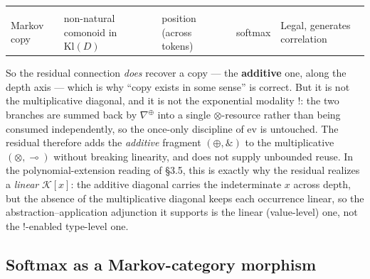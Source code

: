 \documentclass[a4paper,11pt]{article}
\begin{document}
\begin{longtable}[]{@{}lllll@{}}
\begin{minipage}[t]{0.17\columnwidth}
\end{minipage}\tabularnewline
\begin{minipage}[t]{0.17\columnwidth}\raggedright
Markov copy\strut
\end{minipage} & \begin{minipage}[t]{0.17\columnwidth}\raggedright
non-natural comonoid in \(\mathrm{Kl}(D)\)\strut
\end{minipage} & \begin{minipage}[t]{0.17\columnwidth}\raggedright
position (across tokens)\strut
\end{minipage} & \begin{minipage}[t]{0.17\columnwidth}\raggedright
softmax\strut
\end{minipage} & \begin{minipage}[t]{0.17\columnwidth}\raggedright
Legal, generates correlation\strut
\end{minipage}\tabularnewline
\bottomrule
\end{longtable}

So the residual connection \emph{does} recover a copy --- the
\textbf{additive} one, along the depth axis --- which is why ``copy
exists in some sense'' is correct. But it is not the multiplicative
diagonal, and it is not the exponential modality \(!\): the two branches
are summed back by \(\nabla^{\oplus}\) into a single
\(\otimes\)-resource rather than being consumed independently, so the
once-only discipline of \(\mathrm{ev}\) is untouched. The residual
therefore adds the \emph{additive} fragment \((\oplus,\&)\) to the
multiplicative \((\otimes,\multimap)\) without breaking linearity, and
does not supply unbounded reuse. In the polynomial-extension reading of
§3.5, this is exactly why the residual realizes a \emph{linear}
\(\mathcal{K}[x]\): the additive diagonal carries the indeterminate
\(x\) across depth, but the absence of the multiplicative diagonal keeps
each occurrence linear, so the abstraction--application adjunction it
supports is the linear (value-level) one, not the \(!\)-enabled type-level one.

\hypertarget{softmax-as-a-markov-category-morphism}{%
\subsection{Softmax as a Markov-category morphism}\label{softmax-as-a-markov-category-morphism}}
\end{document}

